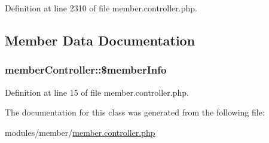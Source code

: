 Definition at line 2310 of file member.\-controller.\-php.



\subsection{Member Data Documentation}
\hypertarget{classmemberController_a01868bd628d8e1b39a4256352fccad44}{
\subsubsection[{\$member\-Info}]{\setlength{\rightskip}{0pt plus 5cm}member\-Controller\-::\$member\-Info}}\label{classmemberController_a01868bd628d8e1b39a4256352fccad44}


Definition at line 15 of file member.\-controller.\-php.



The documentation for this class was generated from the following file\-:\begin{DoxyCompactItemize}
\item 
modules/member/\hyperlink{member_8controller_8php}{member.\-controller.\-php}\end{DoxyCompactItemize}
